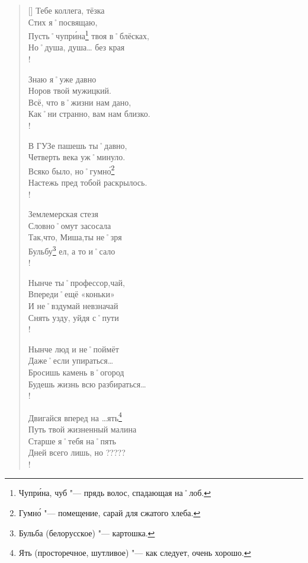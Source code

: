 \clearpage							%
\settowidth{\versewidth}{Норов твой мужицкий.}		%
\begin{verse}[\versewidth]
Тебе коллега, тёзка           \\
Стих я˚посвящаю,               \\
Пусть˚чупр\'{и}на\footnote{Чупр\'{и}на, чуб "--- прядь волос, спадающая на˚лоб.} твоя в˚блёсках, \\
Но˚душа, душа… без края \\!

\vin Знаю я˚уже давно               \\						%
\vin Норов твой мужицкий.            \\
\vin Всё, что в˚жизни нам дано,      \\
\vin Как˚ни странно, вам нам близко. \\!

В ГУЗе пашешь ты˚давно,         \\
Четверть века уж˚минуло.        \\
Всяко было, но˚гумн\'{о}\footnote{Гумн\'{о} "--- помещение, сарай для сжатого хлеба.}           \\
Настежь пред тобой раскрылось. \\!

\vin Землемерская стезя             \\
\vin Словно˚омут засосала           \\
\vin Так,что, Миша,ты не˚зря        \\
\vin Бульбу\footnote{Бульба (белорусское) "--- картошка.} ел, а то и˚сало \\!

Нынче ты˚профессор,чай,        \\
Впереди˚ещё «коньки»             \\
И не˚вздумай невзначай         \\
Снять узду, уйдя с˚пути  				\\!

\vin Нынче люд и не˚поймёт          \\
\vin Даже˚если упираться…         \\
\vin Бросишь камень в˚огород        \\
\vin Будешь жизнь всю разбираться… \\!

Двигайся вперед на …ять\footnote{Ять (просторечное, шутливое) "--- как следует, очень хорошо.}      \\
Путь твой жизненный малина     \\
Старше я˚тебя на˚пять          \\
Дней всего лишь, но ?????\todo[Неразборчиво]{} \\!



\end{verse}
